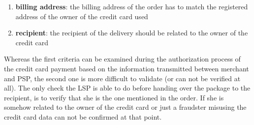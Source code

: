 \begin{enumerate}
  \item \textbf{billing address}: the billing address of the order has to match the registered address of the owner of the credit card used
  \item \textbf{recipient}: the recipient of the delivery should be related to the owner of the credit card
\end{enumerate}

Whereas the first criteria can be examined during the authorization process of the credit card payment based on the information transmitted between merchant and \gls{PSP}, the second one is more difficult to validate (or can not be verified at all). The only check the \gls{LSP} is able to do before handing over the package to the recipient, is to verify that she is the one mentioned in the order. If she is somehow related to the owner of the credit card or just a fraudster misusing the credit card data can not be confirmed at that point. \\


